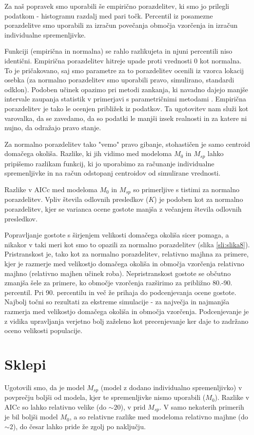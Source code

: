 Za naš popravek smo uporabili še empirično porazdelitev, ki smo jo prilegli podatkom - histogramu razdalj med pari točk. Percentil iz posamezne porazdelitve smo uporabili za izračun povečanja območja vzorčenja in izračun individualne spremenljivke.

Funkciji (empirična in normalna) se rahlo razlikujeta in njuni percentili niso identični. Empirična porazdelitev hitreje upade proti vrednosti 0 kot normalna. To je pričakovano, saj smo parametre za to porazdelitev ocenili iz vzorca lokacij osebka (za normalno porazdelitev smo uporabili pravo, simulirano, standardi odklon). Podoben učinek opazimo pri metodi zankanja, ki navadno dajejo manjše intervale zaupanja statistik v primerjavi s parametričnimi metodami \citep{hesterberg_what_2015}. Empirična porazdelitev je tako le ocenjen približek iz podatkov. Ta ugotovitev nam služi kot varovalka, da se zavedamo, da so podatki le manjši izsek realnosti in za katere ni nujno, da odražajo pravo stanje.

Za normalno porazdelitev tako "vemo" pravo gibanje, stohastičen je samo centroid domačega okoliša. Razlike, ki jih vidimo med modeloma $M_0$ in $M_{sp}$ lahko pripišemo razlikam funkcij, ki jo uporabimo za računanje individualne spremenljivke in na račun odstopanj centroidov od simulirane vrednosti.

Razlike v AICc med modeloma $M_0$ in $M_{sp}$ so primerljive s tistimi za normalno porazdelitev. Vpliv števila odlovnih presledkov ($K$) je podoben kot za normalno porazdelitev, kjer se varianca ocene gostote manjša z večanjem števila odlovnih presledkov.

Popravljanje gostote s širjenjem velikosti domačega okoliša sicer pomaga, a nikakor v taki meri kot smo to opazili za normalno porazdelitev (slika \ref{sli:slika8}). Pristranskost je, tako kot za normalno porazdelitev, relativno majhna za primere, kjer je razmerje med velikostjo domačega okoliša in območja vzorčenja relativno majhno (relativno majhen učinek roba). Nepristranskost gostote se občutno zmanjša šele za primere, ko območje vzorčenja razširimo za približno 80.-90. percentil. Pri 90. percentilu in več že prihaja do podcenjevanja ocene gostote. Najbolj točni so rezultati za ekstreme simulacije - za največja in najmanjša razmerja med velikostjo domačega okoliša in območja vzorčenja. Podcenjevanje je z vidika upravljanja verjetno bolj zaželeno kot precenjevanje ker daje to zadržano oceno velikosti populacije.

\section{Sklepi}
Ugotovili smo, da je model $M_{sp}$ (model z dodano individualno spremenljivko) v povprečju boljši od modela, kjer te spremenljivke nismo uporabili ($M_0$). Razlike v AICc so lahko relativno velike (do $\sim 20$), v prid $M_{sp}$. V samo nekaterih primerih je bil boljši model $M_0$, a so relativne razlike med modeloma relativno majhne (do $\sim 2$), do česar lahko pride že zgolj po naključju.

